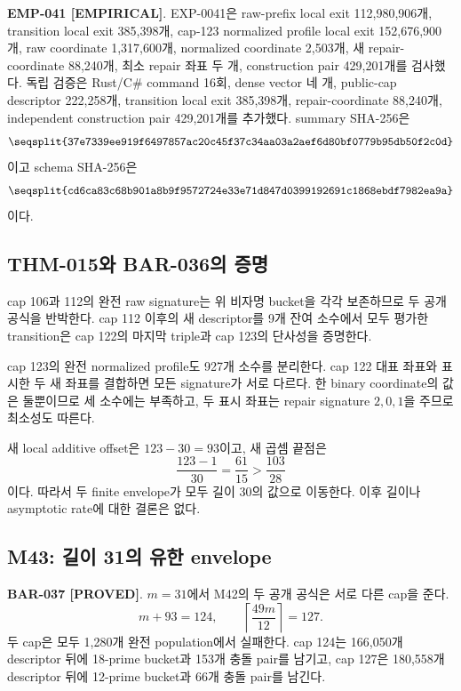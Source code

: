 \documentclass[11pt]{article}
\newcommand{\claimstatus}[2]{\textbf{#1 [#2]}}
\begin{document}
\claimstatus{EMP-041}{EMPIRICAL}.
EXP-0041은 raw-prefix local exit 112,980,906개, transition local exit
385,398개, cap-123 normalized profile local exit 152,676,900개,
raw coordinate 1,317,600개, normalized coordinate 2,503개, 새
repair-coordinate 88,240개, 최소 repair 좌표 두 개, construction
pair 429,201개를 검사했다. 독립 검증은 Rust/C\# command 16회,
dense vector 네 개, public-cap descriptor 222,258개, transition
local exit 385,398개, repair-coordinate 88,240개, independent
construction pair 429,201개를 추가했다. summary SHA-256은
\[
\texttt{\seqsplit{37e7339ee919f6497857ac20c45f37c34aa03a2aef6d80bf0779b95db50f2c0d}}
\]
이고 schema SHA-256은
\[
\texttt{\seqsplit{cd6ca83c68b901a8b9f9572724e33e71d847d0399192691c1868ebdf7982ea9a}}
\]
이다.

\subsection{THM-015와 BAR-036의 증명}

cap 106과 112의 완전 raw signature는 위 비자명 bucket을 각각
보존하므로 두 공개 공식을 반박한다. cap 112 이후의 새 descriptor를
9개 잔여 소수에서 모두 평가한 transition은 cap 122의 마지막
triple과 cap 123의 단사성을 증명한다.

cap 123의 완전 normalized profile도 927개 소수를 분리한다. cap 122
대표 좌표와 표시한 두 새 좌표를 결합하면 모든 signature가 서로
다르다. 한 binary coordinate의 값은 둘뿐이므로 세 소수에는 부족하고,
두 표시 좌표는 repair signature \(2,0,1\)을 주므로 최소성도 따른다.

새 local additive offset은 \(123-30=93\)이고, 새 곱셈 끝점은
\[
\frac{123-1}{30}=\frac{61}{15}>\frac{103}{28}
\]
이다. 따라서 두 finite envelope가 모두 길이 30의 값으로 이동한다.
이후 길이나 asymptotic rate에 대한 결론은 없다.

\subsection{M43: 길이 31의 유한 envelope}

\claimstatus{BAR-037}{PROVED}.
\(m=31\)에서 M42의 두 공개 공식은 서로 다른 cap을 준다.
\[
m+93=124,\qquad
\left\lceil\frac{49m}{12}\right\rceil=127.
\]
두 cap은 모두 1,280개 완전 population에서 실패한다. cap 124는
166,050개 descriptor 뒤에 18-prime bucket과 153개 충돌 pair를
남기고, cap 127은 180,558개 descriptor 뒤에 12-prime bucket과
66개 충돌 pair를 남긴다.
\end{document}
